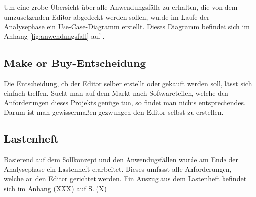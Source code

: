 Um eine grobe Übersicht über alle Anwendungsfälle zu erhalten, die von dem umzusetzenden Editor
abgedeckt werden sollen, wurde im Laufe der Analysephase ein Use-Case-Diagramm erstellt. Dieses
Diagramm befindet sich im Anhang \autoref{fig:anwendungsfall} auf .

\subsection{\glqq Make or Buy\grqq -Entscheidung}
Die Entscheidung, ob der Editor selber erstellt oder gekauft werden soll, lässt sich einfach treffen. Sucht man auf dem Markt nach Softwareteilen, welche den Anforderungen dieses Projekts genüge tun, so findet man nichts entsprechendes. Darum ist man gewissermaßen gezwungen den Editor selbst zu erstellen.

\subsection{Lastenheft}

Basierend auf dem Sollkonzept und den Anwendugsfällen wurde am Ende der Analysephase ein Lastenheft erarbeitet. Dieses umfasst alle Anforderungen, welche an den Editor gerichtet werden. Ein Auszug aus dem Lastenheft befindet sich im Anhang (XXX) auf S. (X)

\newpage
